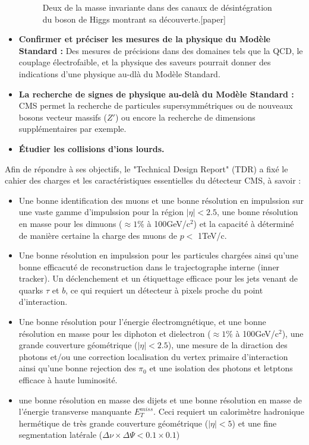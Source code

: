 \begin{itemize}[label=$\bullet$]
\begin{figure}[h!]
		\caption{Deux de la masse invariante dans des canaux de désintégration du boson de Higgs montrant sa découverte.[paper]}
		\label{higgs}
	\end{figure}
	\item \textbf{Confirmer et préciser les mesures de la physique du Modèle Standard : } Des mesures de précisions dans des domaines tels que la QCD, le couplage électrofaible, et la physique des saveurs pourrait donner des indications d'une physique au-dlà du Modèle Standard.
	\item \textbf{La recherche de signes de physique au-delà du Modèle Standard : }CMS permet la recherche de particules supersymmétriques ou de nouveaux bosons vecteur massifs ($Z'$) ou encore la recherche de dimensions supplémentaires par exemple.
	\item \textbf{Étudier les collisions d'ions lourds.}
\end{itemize}

Afin de répondre à ses objectifs, le "Technical Design Report" (TDR) a fixé le cahier des charges et les caractéristiques essentielles du détecteur CMS, à savoir :
\begin{itemize}[label=$\bullet$]
	\item Une bonne identification des muons et une bonne résolution en impulssion sur une vaste gamme d'impulssion pour la région $|\eta|<2.5$, une bonne résolution en masse pour les dimuons ($\approx 1\%$ à 100GeV/c$^{2}$) et la capacité à déterminé de manière certaine la charge des muons de $p<$ 1TeV/c.
	\item Une bonne résolution en impulssion pour les particules chargées ainsi qu'une bonne efficacuté de reconstruction dans le trajectographe interne (inner tracker). Un déclenchement et un étiquettage efficace pour les jets venant de quarks $\tau$ et $b$, ce qui requiert un détecteur à pixels proche du point d'interaction.
	\item Une bonne résolution pour l'énergie électromgnétique, et une bonne résolution en masse pour les diphoton et dielectron  ($\approx 1\%$ à 100GeV/c$^{2}$), une grande couverture géométrique ($|\eta|<2.5$), une mesure de la diraction des photons et/ou une correction localisation du vertex primaire d'interaction ainsi qu'une bonne rejection des $\pi_{0}$ et une isolation des photons et letptons efficace à haute luminosité.
	\item une bonne résolution en masse des dijets et une bonne résolution en masse de l'énergie transverse manquante $E_{T}^{miss}$. Ceci requiert un calorimètre hadronique hermétique de très grande couverture géométrique ($|\eta|<5$) et une fine segmentation latérale ($\Delta\nu\times\Delta\Psi<0.1\times0.1$)
\end{itemize} 

